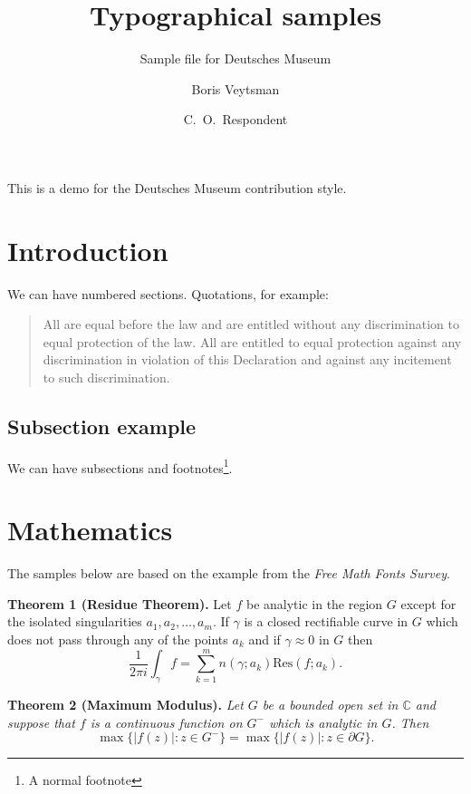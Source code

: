 \documentclass[nocfonts,fleqn]{deutschesmuseum}
\begin{document}
\title{Typographical samples}
\subtitle{Sample file for Deutsches Museum}
\author{Boris Veytsman \and C.~O.~Respondent}
\maketitle

This is a demo for the Deutsches Museum contribution style.

\section{Introduction}
\label{sec:intro}

We can have numbered sections.  Quotations, for
example\cite[][Article~7]{UNDeclaration}: 
\begin{quote}
  All are equal before the law and are entitled without any
  discrimination to equal protection of the law. All are entitled to
  equal protection against any discrimination in violation of this
  Declaration and against any incitement to such discrimination. 
\end{quote}

\subsection{Subsection example}
\label{sec:subsection}

We can have subsections and footnotes\footnote{A normal footnote}.

\section{Mathematics}
\label{sec:math}

The samples below are based on the example from the \emph{Free Math
  Fonts Survey}\cite{Hartke06,
  free-math-font-survey}.


\textbf{Theorem 1 (Residue Theorem).}
Let $f$ be analytic in the region $G$ except for the isolated singularities $a_1,a_2,\ldots,a_m$. If $\gamma$ is a closed rectifiable curve in $G$ which does not pass through any of the points $a_k$ and if $\gamma\approx 0$ in $G$ then
\[
\frac{1}{2\pi i}\int_\gamma f = \sum_{k=1}^m n(\gamma;a_k) \text{Res}(f;a_k).
\]

\textbf{Theorem 2 (Maximum Modulus).}
\emph{Let $G$ be a bounded open set in $\mathbb{C}$ and suppose that $f$ is a continuous function on $G^-$ which is analytic in $G$. Then}
\[
\max\{|f(z)|:z\in G^-\}=\max \{|f(z)|:z\in \partial G \}.
\]
\end{document}
